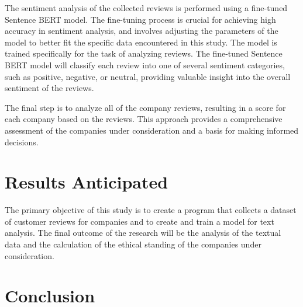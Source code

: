 \documentclass[PI]{ProjectProposal}
\begin{document}
The sentiment analysis of the collected reviews is performed using a fine-tuned Sentence BERT \autocite{reimers-2019-sentence-bert} model. The fine-tuning process is crucial for achieving high accuracy in sentiment analysis, and involves adjusting the parameters of the model to better fit the specific data encountered in this study. The model is trained specifically for the task of analyzing reviews. The fine-tuned Sentence BERT model will classify each review into one of several sentiment categories, such as positive, negative, or neutral, providing valuable insight into the overall sentiment of the reviews.

The final step is to analyze all of the company reviews, resulting in a score for each company based on the reviews. This approach provides a comprehensive assessment of the companies under consideration and a basis for making informed decisions.
\chapter{Results Anticipated}
\label{sec:orgea5774a}
The primary objective of this study is to create a program that collects a dataset of customer reviews for companies and to create and train a model for text analysis. The final outcome of the research will be the analysis of the textual data and the calculation of the ethical standing of the companies under consideration.
\chapter{Conclusion}
\label{sec:org36f3857}

\putbibliography
\appendix
\end{document}
